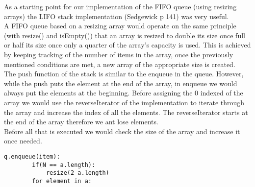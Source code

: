 \documentclass[a4paper]{article}
\begin{document}
\noindent
As a starting point for our implementation of the FIFO queue (using resizing arrays) the LIFO stack implementation (Sedgewick p 141) was very useful.
\ \\

\noindent
A FIFO queue based on a resizing array would operate on the same principle (with resize() and isEmpty()) that an array is resized 
to double its size once full or half its size once only a quarter of the array's capacity is used. This is achieved by keeping tracking of 
the number of items in the array, once the previously mentioned conditions are met, a new array 
of the appropriate size is created.
\ \\

\noindent
The push function of the stack is similar to the enqueue in the queue. However, while the push puts the element at the end of the array, in enqueue we would always put the elements at the beginning. Before assigning the 0 indexed of the array we would use the reverseIterator of the implementation to iterate through the array and increase the index of all the elements. The reverseIterator starts at the end of the array therefore we ant lose elements.
\ \\

\noindent
Before all that is executed we would check the size of the array and increase it once needed.

\begin{lstlisting}[escapeinside={{*}{*}}]
    q.enqueue(item):
    	if(N == a.length):
    		resize(2 a.length)
    	for element in a:
    		
\end{lstlisting}
\end{document}
